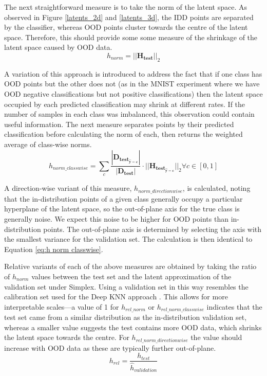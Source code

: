 \documentclass{article}
\begin{document}
The next straightforward measure is to take the norm of the latent space. As observed in Figure \ref{latents_2d} and \ref{latents_3d}, the IDD points are separated by the classifier, whereas OOD points cluster towards the centre of the latent space. Therefore, this should provide some some measure of the shrinkage of the latent space caused by OOD data.
\begin{equation}
\label{eq:h norm}
	h_{norm} = ||\bm{H_{test}}||_2
\end{equation}

A variation of this approach is introduced to address the fact that if one class has OOD points but the other does not (as in the MNIST experiment where we have OOD negative classifications but not positive classifications) then the latent space occupied by each predicted classification may shrink at different rates. If the number of samples in each class was imbalanced, this observation could contain useful information. The next measure separates points by their predicted classification before calculating the norm of each, then returns the weighted average of class-wise norms.
\begin{equation}
\label{eq:h norm classwise}
	h_{norm\_classwise} =\sum_c \frac{|\bm{D_{test_{\hat{y}=c}}}|}{|\bm{D_{test}}|} \cdot ||\bm{H_{test_{\hat{y}=c}}}||_2 \forall c \in  [0, 1]
\end{equation}

A direction-wise variant of this measure, $h_{norm\_directionwise}$, is calculated, noting that the in-distribution points of a given class generally occupy a particular hyperplane of the latent space, so the out-of-plane axis for the true class is generally noise. We expect this noise to be higher for OOD points than in-distribution points. The out-of-plane axis is determined by selecting the axis with the smallest variance for the validation set. The calculation is then identical to Equation \ref{eq:h norm classwise}.

Relative variants of each of the above measures are obtained by taking the ratio of $h_{norm}$ values between the test set and the latent approximation of the validation set under Simplex. Using a validation set in this way resembles the calibration set used for the Deep KNN approach \cite{papernot_deep_2018}. This allows for more interpretable scales---a value of 1 for $h_{rel\_norm}$ or $h_{rel\_norm\_classwise}$ indicates that the test set came from a similar distribution as the in-distribution validation set, whereas a smaller value suggests the test contains more OOD data, which shrinks the latent space towards the centre. For $h_{rel\_norm\_directionwise}$ the value should increase with OOD data as these are typically further out-of-plane.
\begin{equation}
\label{eq:relative h norm}
	h_{rel} = \frac{h_{test}}{\hat{h}_{validation}}
\end{equation}
\end{document}
